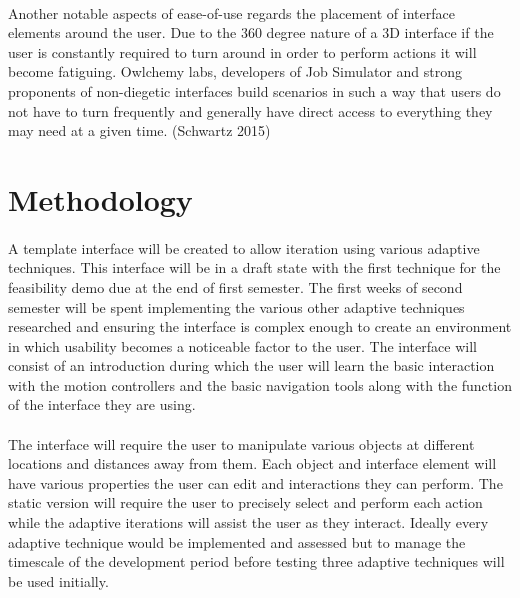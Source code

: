 \documentclass[11pt]{article}
\begin{document}
\paragraph{} 
Another notable aspects of ease-of-use regards the placement of interface elements around the user. Due to the 360 degree nature of a 3D interface if the user is constantly required to turn around in order to perform actions it will become fatiguing. Owlchemy labs, developers of Job Simulator and strong proponents of non-diegetic interfaces build scenarios in such a way that users do not have to turn frequently and generally have direct access to everything they may need at a given time. (Schwartz 2015)


\section{Methodology}

\paragraph{}
A template interface will be created to allow iteration using various adaptive techniques. This interface will be in a draft state with the first technique for the feasibility demo due at the end of first semester. The first weeks of second semester will be spent implementing the various other adaptive techniques researched and ensuring the interface is complex enough to create an environment in which usability becomes a noticeable factor to the user. The interface will consist of an introduction during which the user will learn the basic interaction with the motion controllers and the basic navigation tools along with the function of the interface they are using.

\paragraph{}
The interface will require the user to manipulate various objects at different locations and distances away from them. Each object and interface element will have various properties the user can edit and interactions they can perform. The static version will require the user to precisely select and perform each action while the adaptive iterations will assist the user as they interact. Ideally every adaptive technique would be implemented and assessed but to manage the timescale of the development period before testing three adaptive techniques will be used initially.
\end{document}
